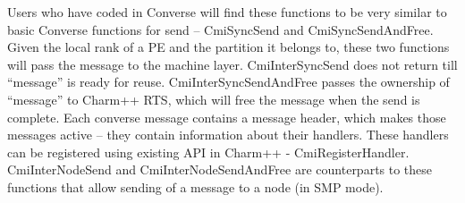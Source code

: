 Users who have coded in Converse will find these functions to be very similar
to basic Converse functions for send – CmiSyncSend and CmiSyncSendAndFree.
Given the local rank of a PE and the partition it belongs to, these two
functions will pass the message to the machine layer. CmiInterSyncSend does
not return till “message” is ready for reuse. CmiInterSyncSendAndFree passes
the ownership of “message” to Charm++ RTS, which will free the message when
the send is complete. Each converse message contains a message header, which
makes those messages active – they contain information about their handlers.
These handlers can be registered using existing API in Charm++ -
CmiRegisterHandler.  CmiInterNodeSend and CmiInterNodeSendAndFree are
counterparts to these functions that allow sending of a message to a node (in
    SMP mode).



